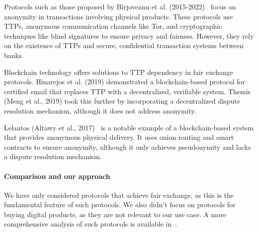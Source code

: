\documentclass[pdftex,twocolumn,epjc3]{svjour3}
\begin{document}
\begin{sloppypar}
Protocols such as those proposed by Bîrjoveanu et al. (2015-2022)~\cite{birjoveanuAnonymityFairexchangeEcommerce2015, birjoveanuPreservingAnonymityFair2018, birjoveanuAnonymityComplexTransactions2019, birjoveanuFairExchangeECommerce2020, birjoveanuTwoPartyECommerceProtocols2022} focus on anonymity in transactions involving physical products. These protocols use TTPs, anonymous communication channels like Tor, and cryptographic techniques like blind signatures to ensure privacy and fairness. However, they rely on the existence of TTPs and secure, confidential transaction systems between banks.
\end{sloppypar}

Blockchain technology offers solutions to TTP dependency in fair exchange protocols. Hinarejos et al. (2019)\cite{hinarejosSolutionSecureCertified2019} demonstrated a blockchain-based protocol for certified email that replaces TTP with a decentralized, verifiable system. Themis (Meng et al., 2019)\cite{mengThemisDecentralizedEscrow2019} took this further by incorporating a decentralized dispute resolution mechanism, although it does not address anonymity.

Lelantos (Altawy et al., 2017)~\cite{altawyLelantosBlockchainBasedAnonymous2017} is a notable example of a blockchain-based system that provides anonymous physical delivery. It uses onion routing and smart contracts to ensure anonymity, although it only achieves pseudonymity and lacks a dispute resolution mechanism.

\paragraph{Comparison and our approach}

\begin{sloppypar}
We have only considered protocols that achieve fair exchange, as this is the fundamental feature of such protocols.
We also didn't focus on protocols for buying digital products, as they are not relevant to our use case. A more comprehensive analysis of such protocols is available in~\cite{birjoveanuTwoPartyECommerceProtocols2022}.
\end{sloppypar}
\end{document}
